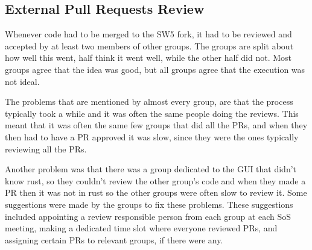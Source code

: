 \subsection{External Pull Requests Review}\label{sec:externalPRreview}
Whenever code had to be merged to the SW5 fork, it had to be reviewed and accepted by at least two members of other groups.
The groups are split about how well this went, half think it went well, while the other half did not.
Most groups agree that the idea was good, but all groups agree that the execution was not ideal.

The problems that are mentioned by almost every group, are that the process typically took a while and it was often the same people doing the reviews.
This meant that it was often the same few groups that did all the PRs, and when they then had to have a PR approved it was slow, since they were the ones typically reviewing all the PRs.

Another problem was that there was a group dedicated to the GUI that didn't know rust, so they couldn't review the other group's code and when they made a PR then it was not in rust so the other groups were often slow to review it.
Some suggestions were made by the groups to fix these problems. These suggestions included appointing a review responsible person from each group at each SoS meeting, making a dedicated time slot where everyone reviewed PRs, and assigning certain PRs to relevant groups, if there were any.
